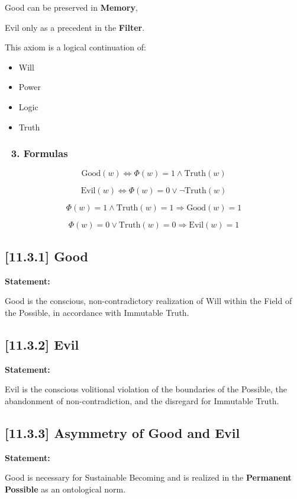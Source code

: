 \documentclass[12pt]{article}
\begin{document}
Good can be preserved in \textbf{Memory},

Evil only as a precedent in the \textbf{Filter}.

This axiom is a logical continuation of:

\begin{itemize}
\item \text{[10.6]} Will
\item \text{[10.7]} Power
\item \text{[11.1]} Logic
\item \text{[11.2]} Truth
\end{itemize}

\subsubsection*{🔹 3. Formulas}

\[
\text{Good}(w) \iff \Phi(w) = 1 \land \text{Truth}(w)
\]

\[
\text{Evil}(w) \iff \Phi(w) = 0 \lor \neg \text{Truth}(w)
\]

\[
\Phi(w) = 1 \land \text{Truth}(w) = 1 \Rightarrow \text{Good}(w) = 1
\]

\[
\Phi(w) = 0 \lor \text{Truth}(w) = 0 \Rightarrow \text{Evil}(w) = 1
\]

\subsection*{[11.3.1] Good}

\textbf{Statement:}

Good is the conscious, non-contradictory realization of Will within the Field of the Possible, in accordance with Immutable Truth.

\subsection*{[11.3.2] Evil}

\textbf{Statement:}

Evil is the conscious volitional violation of the boundaries of the Possible, the abandonment of non-contradiction, and the disregard for Immutable Truth.

\subsection*{[11.3.3] Asymmetry of Good and Evil}

\textbf{Statement:}

Good is necessary for Sustainable Becoming and is realized in the \textbf{Permanent Possible} as an ontological norm.
\end{document}
